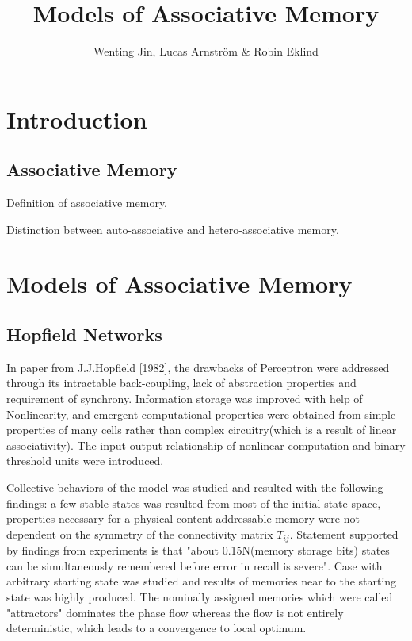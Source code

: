\documentclass[12pt, a4paper]{article}
\title{Models of Associative Memory}
\author{Wenting Jin, Lucas Arnström \& Robin Eklind}
\begin{document}
\maketitle

\tableofcontents

\clearpage



\section{Introduction}

\subsection{Associative Memory}

Definition of associative memory.

Distinction between auto-associative and hetero-associative memory.


\section{Models of Associative Memory}

\subsection{Hopfield Networks}


In paper from J.J.Hopfield [1982], the drawbacks of Perceptron were addressed through its intractable back-coupling, lack of abstraction properties and requirement of synchrony. Information storage was improved with help of Nonlinearity, and emergent computational properties were obtained from simple properties of many cells rather than complex circuitry(which is a result of linear associativity). The input-output relationship of nonlinear computation and binary threshold units were introduced.

Collective behaviors of the model was studied and resulted with the following findings: a few stable states was resulted from most of the initial state space, properties necessary for a physical content-addressable memory were not dependent on the symmetry of the connectivity matrix $T_{ij}$. Statement supported by findings from experiments is that "about 0.15N(memory storage bits) states can be simultaneously remembered before error in recall is severe". Case with arbitrary starting state was studied and results of memories near to the starting state was highly produced. The nominally assigned memories which were called "attractors" dominates the phase flow whereas the flow is not entirely deterministic, which leads to a convergence to local optimum.
\end{document}
